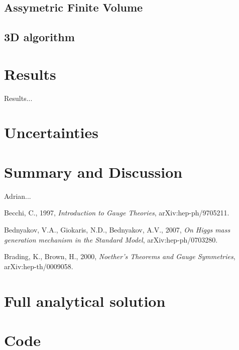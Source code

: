 \documentclass[aps,twocolumn,pre,nofootinbib,10pt]{revtex4-1}
\begin{document}
\subsection{Assymetric Finite Volume }


\subsection{3D algorithm}






\section{Results \label{sec:res}}


Results...


\section{Uncertainties \label{sec:unc}}




\section{Summary and Discussion \label{sec:sum}}


\begin{acknowledgments}
Adrian...
\end{acknowledgments}

\begin{thebibliography}{5}

 Becchi, C., 1997, \emph{Introduction to Gauge Theories}, arXiv:hep-ph/9705211.

 Bednyakov, V.A., Giokaris, N.D., Bednyakov, A.V., 2007, \emph{On Higgs mass generation mechanism in the Standard Model}, 	arXiv:hep-ph/0703280.

 Brading, K., Brown, H., 2000, \emph{Noether's Theorems and Gauge Symmetries}, arXiv:hep-th/0009058.



\end{thebibliography}



\appendix*
\section{Full analytical solution}
\section{Code}
\end{document}
